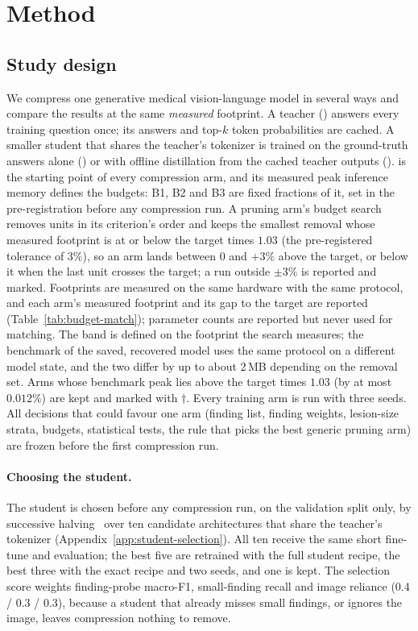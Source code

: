 \section{Method}
\label{sec:method}

\subsection{Study design}
We compress one generative medical vision-language model in several ways and
compare the results at the same \emph{measured} footprint. A teacher
() answers every training question once; its answers and top-$k$ token
probabilities are cached. A smaller student that shares the teacher's tokenizer is
trained on the ground-truth answers alone () or with offline distillation
from the cached teacher outputs ().  is the starting point of every
compression arm, and its measured peak inference memory defines the budgets: B1, B2
and B3 are fixed fractions of it, set in the pre-registration before any
compression run. A pruning arm's budget search removes units in its criterion's order
and keeps the smallest removal whose measured footprint is at or below the target
times $1.03$ (the pre-registered tolerance of 3\%), so an arm lands between $0$ and
$+3\%$ above the target, or below it when the last unit crosses the target; a run
outside $\pm3\%$ is reported and marked. Footprints are measured on the same hardware
with the same protocol, and each arm's measured footprint and its gap to the target are
reported (Table~\ref{tab:budget-match}); parameter counts are reported but never used
for matching. The band is defined on the footprint the search measures; the benchmark of
the saved, recovered model uses the same protocol on a different model state, and the two
differ by up to about 2\,MB depending on the removal set. Arms whose benchmark peak lies
above the target times $1.03$ (by at most $0.012\%$) are kept and marked with $\dagger$. Every training arm is
run with three seeds. All decisions that could favour one arm (finding list, finding
weights, lesion-size strata, budgets, statistical tests, the rule that picks the
best generic pruning arm) are frozen before the first compression run.

\paragraph{Choosing the student.}
The student is chosen before any compression run, on the validation split only, by
successive halving~\cite{jamieson2016successivehalving,li2018hyperband} over ten
candidate architectures that share the teacher's tokenizer
(Appendix~\ref{app:student-selection}). All ten receive the same short fine-tune and
evaluation; the best five are retrained with the full student recipe, the best
three with the exact  recipe and two seeds, and one is kept. The selection
score weights finding-probe macro-F1, small-finding recall and image reliance
(0.4 / 0.3 / 0.3), because a student that already misses small findings, or ignores
the image, leaves compression nothing to remove.

